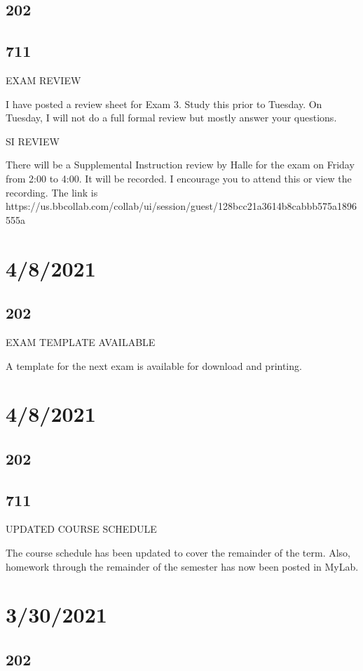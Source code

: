 \documentclass[]{article}
\begin{document}
\subsection*{202}
\subsection*{711}
EXAM REVIEW

I have posted a review sheet for Exam 3. Study this prior to Tuesday. On Tuesday, I will not do a full formal review but mostly answer your questions.

SI REVIEW

There will be a Supplemental Instruction review by Halle for the exam on Friday from 2:00 to 4:00. It will be recorded. I encourage you to attend this or view the recording. The link is https://us.bbcollab.com/collab/ui/session/guest/128bcc21a3614b8cabbb575a1896555a

\section*{4/8/2021}
\subsection*{202}
EXAM TEMPLATE AVAILABLE

A template for the next exam is available for download and printing.

\section*{4/8/2021}
\subsection*{202}
\subsection*{711}
UPDATED COURSE SCHEDULE

The course schedule has been updated to cover the remainder of the term. Also, homework through the remainder of the semester has now been posted in MyLab.

\section*{3/30/2021}
\subsection*{202}
\end{document}
